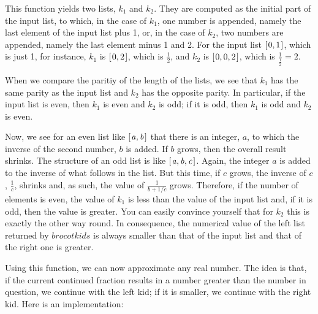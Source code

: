 \documentclass[tikz]{scrreprt}
\newcommand{\Varid}[1]{\mathit{#1}}
\begin{document}
This function yields two lists, $k_1$ and $k_2$.
They are computed as 
the initial part of the input list,
to which, in the case of $k_1$, one number is appended,
namely the last element of the input list plus 1,
or, in the case of $k_2$, two numbers are appended, namely
the last element minus 1 and 2. 
For the input list \ensuremath{[\mskip1.5mu \mathrm{0},\mathrm{1}\mskip1.5mu]}, 
which is just 1,
for instance,
$k_1$ is \ensuremath{[\mskip1.5mu \mathrm{0},\mathrm{2}\mskip1.5mu]}, which is $\frac{1}{2}$, and
$k_2$ is \ensuremath{[\mskip1.5mu \mathrm{0},\mathrm{0},\mathrm{2}\mskip1.5mu]}, which is $\frac{1}{\frac{1}{2}} = 2$.

When we compare the paritiy of 
the length of the lists,
we see that $k_1$ has the same parity as the input list 
and $k_2$ has the opposite parity.
In particular, if the input list is even,
then $k_1$ is even and $k_2$ is odd; if it is odd,
then $k_1$ is odd and $k_2$ is even.

Now, we see for an even list like \ensuremath{[\mskip1.5mu \Varid{a},\Varid{b}\mskip1.5mu]} that there is an 
integer, $a$, to which the inverse of the second number,
$b$ is added. If $b$ grows, then the overall result shrinks.
The structure of an odd list is like \ensuremath{[\mskip1.5mu \Varid{a},\Varid{b},\Varid{c}\mskip1.5mu]}.
Again, the integer $a$ is added to the inverse of
what follows in the list.
But this time, if $c$ grows, the inverse of $c$,
$\frac{1}{c}$, shrinks and, as such, the value of
$\frac{1}{b+1/c}$ grows.
Therefore, if the number of elements is even,
the value of $k_1$ is less than the value of the input list
and, if it is odd, then the value is greater.
You can easily convince yourself that for $k_2$
this is exactly the other way round.
In consequence, the numerical value of 
the left list returned by \ensuremath{\Varid{brocotkids}}
is always smaller than that of the input list
and that of the right one is greater.

Using this function, we can now approximate any real number.
The idea is that, if the current continued fraction
results in a number greater than the number in question, we
continue with the left kid; if it is smaller,
we continue with the right kid. Here is an implementation:
\end{document}
